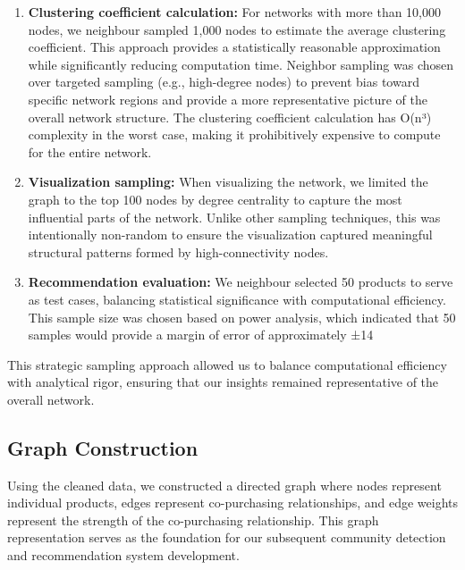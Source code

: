 \documentclass[conference]{IEEEtran}
\begin{document}
\begin{enumerate}
    \item \textbf{Clustering coefficient calculation:} For networks with more than 10,000 nodes, we neighbour sampled 1,000 nodes to estimate the average clustering coefficient. This approach provides a statistically reasonable approximation while significantly reducing computation time. Neighbor sampling was chosen over targeted sampling (e.g., high-degree nodes) to prevent bias toward specific network regions and provide a more representative picture of the overall network structure. The clustering coefficient calculation has O(n³) complexity in the worst case, making it prohibitively expensive to compute for the entire network.
    
    \item \textbf{Visualization sampling:} When visualizing the network, we limited the graph to the top 100 nodes by degree centrality to capture the most influential parts of the network. Unlike other sampling techniques, this was intentionally non-random to ensure the visualization captured meaningful structural patterns formed by high-connectivity nodes.
    
    \item \textbf{Recommendation evaluation:} We neighbour selected 50 products to serve as test cases, balancing statistical significance with computational efficiency. This sample size was chosen based on power analysis, which indicated that 50 samples would provide a margin of error of approximately ±14%
\end{enumerate}

This strategic sampling approach allowed us to balance computational efficiency with analytical rigor, ensuring that our insights remained representative of the overall network.

\subsection{Graph Construction}
Using the cleaned data, we constructed a directed graph where nodes represent individual products, edges represent co-purchasing relationships, and edge weights represent the strength of the co-purchasing relationship. This graph representation serves as the foundation for our subsequent community detection and recommendation system development.
\end{document}
